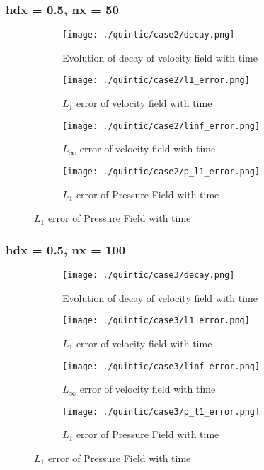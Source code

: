 \documentclass[11pt, a4paper]{article}
\begin{document}
\subsubsection{hdx = 0.5, nx = 50}
\begin{figure}[H]
\begin{subfigure}{0.48\textwidth}
\texttt{[image: ./quintic/case2/decay.png]}
\caption{Evolution of decay of velocity field with time}
\end{subfigure}
\begin{subfigure}{0.48\textwidth}
\texttt{[image: ./quintic/case2/l1\_error.png]}
\caption{$L_1$ error of velocity field with time}
\end{subfigure}
\medskip
\begin{subfigure}{0.48\textwidth}
\texttt{[image: ./quintic/case2/linf\_error.png]}
\caption{$L_\infty$ error of velocity field with time}
\end{subfigure}
\begin{subfigure}{0.48\textwidth}
\texttt{[image: ./quintic/case2/p\_l1\_error.png]}
\caption{$L_1$ error of Pressure Field with time}
\end{subfigure}
\end{figure}

\subsubsection{hdx = 0.5, nx = 100}
\begin{figure}[H]
\begin{subfigure}{0.48\textwidth}
\texttt{[image: ./quintic/case3/decay.png]}
\caption{Evolution of decay of velocity field with time}
\end{subfigure}
\begin{subfigure}{0.48\textwidth}
\texttt{[image: ./quintic/case3/l1\_error.png]}
\caption{$L_1$ error of velocity field with time}
\end{subfigure}
\medskip
\begin{subfigure}{0.48\textwidth}
\texttt{[image: ./quintic/case3/linf\_error.png]}
\caption{$L_\infty$ error of velocity field with time}
\end{subfigure}
\begin{subfigure}{0.48\textwidth}
\texttt{[image: ./quintic/case3/p\_l1\_error.png]}
\caption{$L_1$ error of Pressure Field with time}
\end{subfigure}
\end{figure}
\end{document}
